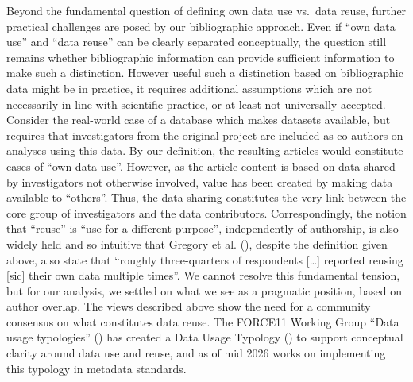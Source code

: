 \documentclass[
  letterpaper,
  DIV=11,
  numbers=noendperiod]{scrartcl}
\begin{document}
Beyond the fundamental question of defining own data use vs.~data reuse,
further practical challenges are posed by our bibliographic approach.
Even if ``own data use'' and ``data reuse'' can be clearly separated
conceptually, the question still remains whether bibliographic
information can provide sufficient information to make such a
distinction. However useful such a distinction based on bibliographic
data might be in practice, it requires additional assumptions which are
not necessarily in line with scientific practice, or at least not
universally accepted. Consider the real-world case of a database which
makes datasets available, but requires that investigators from the
original project are included as co-authors on analyses using this data.
By our definition, the resulting articles would constitute cases of
``own data use''. However, as the article content is based on data
shared by investigators not otherwise involved, value has been created
by making data available to ``others''. Thus, the data sharing
constitutes the very link between the core group of investigators and
the data contributors. Correspondingly, the notion that ``reuse'' is
``use for a different purpose'', independently of authorship, is also
widely held and so intuitive that Gregory et al.
(), despite the definition given above,
also state that ``roughly three-quarters of respondents {[}\ldots{]}
reported reusing {[}sic{]} their own data multiple times''. We cannot
resolve this fundamental tension, but for our analysis, we settled on
what we see as a pragmatic position, based on author overlap. The views
described above show the need for a community consensus on what
constitutes data reuse. The FORCE11 Working Group ``Data usage
typologies'' () has created a Data
Usage Typology () to support conceptual clarity around data use and reuse, and as
of mid 2026 works on implementing this typology in metadata standards.
\end{document}
